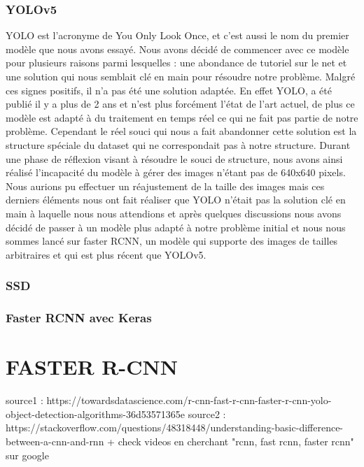 \subsubsection{YOLOv5}
YOLO est l'acronyme de You Only Look Once, et c’est aussi le nom du premier modèle que nous avons essayé.
Nous avons décidé de commencer avec ce modèle pour plusieurs raisons parmi lesquelles :
une abondance de tutoriel sur le net et une solution qui nous semblait clé en main pour résoudre notre problème.
Malgré ces signes positifs, il n’a pas été une solution adaptée.
En effet YOLO, a été publié il y a plus de 2 ans et n’est plus forcément l’état de l’art actuel,
de plus ce modèle est adapté à du traitement en temps réel ce qui ne fait pas partie de notre problème.
Cependant le réel souci qui nous a fait abandonner cette solution est la structure spéciale
du dataset qui ne correspondait pas à notre structure.
Durant une phase de réflexion visant à résoudre le souci de structure, nous avons ainsi réalisé l’incapacité
du modèle à gérer des images n’étant pas de 640x640 pixels.
Nous aurions pu effectuer un réajustement de la taille des images mais
ces derniers éléments nous ont fait réaliser que YOLO n’était pas la solution clé en main à
laquelle nous nous attendions et après quelques discussions nous avons décidé de passer à un modèle
plus adapté à notre problème initial et nous nous sommes lancé sur faster RCNN, un modèle qui supporte
des images de tailles arbitraires et qui est plus récent que YOLOv5.

\subsubsection{SSD}

\subsubsection{Faster RCNN avec Keras}


\section{FASTER R-CNN}

source1 : https://towardsdatascience.com/r-cnn-fast-r-cnn-faster-r-cnn-yolo-object-detection-algorithms-36d53571365e \newline\newline
source2 : https://stackoverflow.com/questions/48318448/understanding-basic-difference-between-a-cnn-and-rnn \newline\newline
+ check videos en cherchant "rcnn, fast rcnn, faster rcnn" sur google






